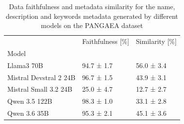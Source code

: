 \begin{table}[h]
\caption{Data faithfulness and metadata similarity for the name, description and keywords metadata generated by different models on the PANGAEA dataset}
\label{tab:results_pan_semantic}
\begin{tabular}{lll}
\toprule
 & Faithfulness [\%] & Similarity [\%] \\
Model &  &  \\
\midrule
Llama3 70B & 94.7 ± 1.7 & 56.0 ± 3.4 \\
Mistral Devstral 2 24B & 96.7 ± 1.5 & 43.9 ± 3.1 \\
Mistral Small 3.2 24B & 25.0 ± 4.7 & 12.7 ± 2.7 \\
Qwen 3.5 122B & 98.3 ± 1.0 & 33.1 ± 2.8 \\
Qwen 3.6 35B & 95.3 ± 2.1 & 45.1 ± 3.6 \\
\bottomrule
\end{tabular}
\end{table}
